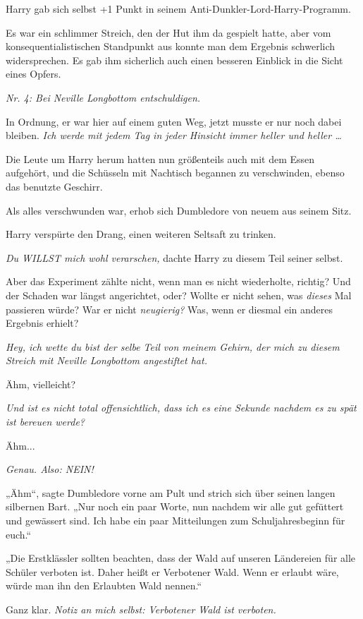 Harry gab sich selbst +1 Punkt in seinem Anti-Dunkler-Lord-Harry-Programm.

Es war ein schlimmer Streich, den der Hut ihm da gespielt hatte, aber vom konsequentialistischen Standpunkt aus konnte man dem Ergebnis schwerlich widersprechen. Es gab ihm sicherlich auch einen besseren Einblick in die Sicht eines Opfers.

\emph{Nr. 4: Bei Neville Longbottom entschuldigen.}

In Ordnung, er war hier auf einem guten Weg, jetzt musste er nur noch dabei bleiben. \emph{Ich werde mit jedem Tag in jeder Hinsicht immer heller und heller …}

Die Leute um Harry herum hatten nun größenteils auch mit dem Essen aufgehört, und die Schüsseln mit Nachtisch begannen zu verschwinden, ebenso das benutzte Geschirr.

Als alles verschwunden war, erhob sich Dumbledore von neuem aus seinem Sitz.

Harry verspürte den Drang, einen weiteren Seltsaft zu trinken.

\emph{Du WILLST mich wohl verarschen,} dachte Harry zu diesem Teil seiner selbst.

Aber das Experiment zählte nicht, wenn man es nicht wiederholte, richtig? Und der Schaden war längst angerichtet, oder? Wollte er nicht sehen, was \emph{dieses} Mal passieren würde? War er nicht \emph{neugierig?} Was, wenn er diesmal ein anderes Ergebnis erhielt?

\emph{Hey, ich wette du bist der selbe Teil von meinem Gehirn, der mich zu diesem Streich mit Neville Longbottom angestiftet hat.}

Ähm, vielleicht?

\emph{Und ist es nicht total offensichtlich, dass ich es eine Sekunde nachdem es zu spät ist bereuen werde?}

Ähm...

\emph{Genau. Also: NEIN!}

„Ähm“, sagte Dumbledore vorne am Pult und strich sich über seinen langen silbernen Bart. „Nur noch ein paar Worte, nun nachdem wir alle gut gefüttert und gewässert sind. Ich habe ein paar Mitteilungen zum Schuljahresbeginn für euch.“

„Die Erstklässler sollten beachten, dass der Wald auf unseren Ländereien für alle Schüler verboten ist. Daher heißt er Verbotener Wald. Wenn er erlaubt wäre, würde man ihn den Erlaubten Wald nennen.“

Ganz klar. \emph{Notiz an mich selbst: Verbotener Wald ist verboten.}

